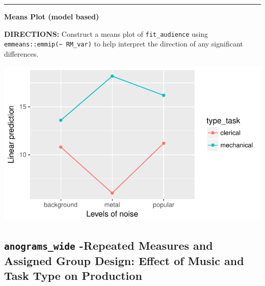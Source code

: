 \documentclass[]{article}
\newenvironment{Shaded}{\begin{snugshade}}{\end{snugshade}}
\newcommand{\KeywordTok}[1]{\textcolor[rgb]{0.13,0.29,0.53}{\textbf{#1}}}
\newcommand{\DataTypeTok}[1]{\textcolor[rgb]{0.13,0.29,0.53}{#1}}
\newcommand{\StringTok}[1]{\textcolor[rgb]{0.31,0.60,0.02}{#1}}
\newcommand{\CommentTok}[1]{\textcolor[rgb]{0.56,0.35,0.01}{\textit{#1}}}
\newcommand{\OperatorTok}[1]{\textcolor[rgb]{0.81,0.36,0.00}{\textbf{#1}}}
\newcommand{\NormalTok}[1]{#1}
\begin{document}
\begin{center}\rule{0.5\linewidth}{\linethickness}\end{center}

\textbf{Means Plot (model based)}

\textbf{DIRECTIONS:} Construct a means plot of \texttt{fit\_audience}
using \texttt{emmeans::emmip(\textasciitilde{}\ RM\_var)} to help
interpret the direction of any significant differences.

\begin{Shaded}
\end{Shaded}

\begin{center}\includegraphics{Unit_5_assignment_KEY_R__spr18__files/figure-latex/unnamed-chunk-56-1} \end{center}

\clearpage

\subsection{\texorpdfstring{\texttt{anograms\_wide} -Repeated Measures
and Assigned Group Design: Effect of Music and Task Type on
Production}{anograms\_wide -Repeated Measures and Assigned Group Design: Effect of Music and Task Type on Production}}\label{anograms_wide--repeated-measures-and-assigned-group-design-effect-of-music-and-task-type-on-production}
\end{document}

